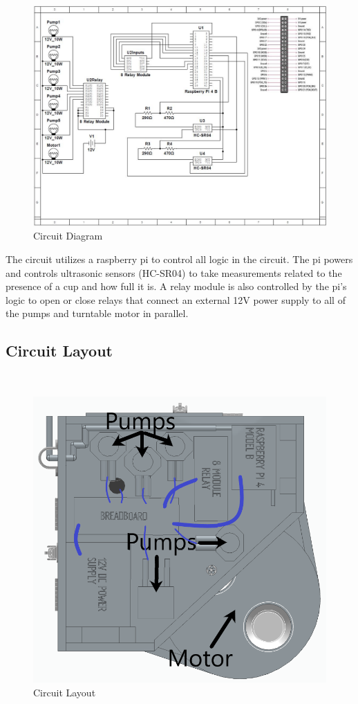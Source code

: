 \documentclass[12pt, titlepage]{article}
\begin{document}
    \begin{figure}[H]
    \centerline{\includegraphics[scale=.75]{Circuit Diagram.JPG}}
    \caption{Circuit Diagram}
    \label{fig}
    \end{figure}
    
The circuit utilizes a raspberry pi to control all logic in the circuit. The pi powers and controls ultrasonic sensors (HC-SR04) to take measurements related to the presence of a cup and how full it is. A relay module is also controlled by the pi's logic to open or close relays that connect an external 12V power supply to all of the pumps and turntable motor in parallel.

\subsection{Circuit Layout}\\ 

    \begin{figure}[H]
    \centerline{\includegraphics[scale=.5]{Circuit Layout.png}}
    \caption{Circuit Layout}
    \label{fig}
    \end{figure}
\end{document}
